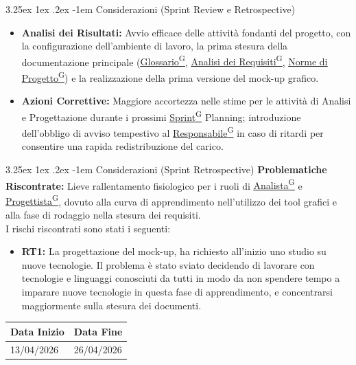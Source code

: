 \documentclass[a4paper,12pt]{article}
\makeatletter
\newcounter{subsubsubsection}[subsubsection]
\renewcommand\paragraph{\@startsection{paragraph}{5}{\z@}%
  {3.25ex \@plus1ex \@minus.2ex}%
  {-1em}%
  {\normalfont\normalsize\bfseries}}
\providecommand{\glslink}[2]{\href{https://alittlebyte-19.github.io/Documentazione/glossario.html\#gls-#1}{\underline{#2}\textsuperscript{\scriptsize G}}}
\makeatother
\begin{document}
\paragraph{Considerazioni (Sprint Review e Retrospective)}
\begin{itemize}
    \item \textbf{Analisi dei Risultati:} Avvio efficace delle attività fondanti del progetto, con la configurazione dell'ambiente di lavoro, la prima stesura della documentazione principale (\glslink{glossario}{Glossario}, \glslink{analisi-dei-requisiti-adr}{Analisi dei Requisiti}, \glslink{norme-di-progetto}{Norme di Progetto}) e la realizzazione della prima versione del mock-up grafico.
    \item \textbf{Azioni Correttive:} Maggiore accortezza nelle stime per le attività di Analisi e Progettazione durante i prossimi \glslink{sprint}{Sprint} Planning; introduzione dell'obbligo di avviso tempestivo al \glslink{responsabile}{Responsabile} in caso di ritardi per consentire una rapida redistribuzione del carico.
\end{itemize}

\paragraph{Considerazioni (Sprint Retrospective)}
\textbf{Problematiche Riscontrate:} Lieve rallentamento fisiologico per i ruoli di \glslink{analista}{Analista} e \glslink{progettista}{Progettista}, dovuto alla curva di apprendimento nell'utilizzo dei tool grafici e alla fase di rodaggio nella stesura dei requisiti.\\

I rischi riscontrati sono stati i seguenti:
\begin{itemize}
    \item \textbf{RT1:} La progettazione del mock-up, ha richiesto all'inizio uno studio su nuove tecnologie. Il problema è stato sviato decidendo di lavorare con tecnologie e linguaggi conosciuti da tutti in modo da non spendere tempo a imparare nuove tecnologie in questa fase di apprendimento, e concentrarsi maggiormente sulla stesura dei documenti. 
\end{itemize}
    \newpage


\label{sec:rtb_secondoperiodo}
\begin{table}[H]
    \centering
    \renewcommand{\arraystretch}{1.5} %
    \begin{tabularx}{\textwidth}{|X|X|}
    \hline \rowcolor{Dandelion!50}
    \textbf{Data Inizio} & \textbf{Data Fine}\\
    \hline
    13/04/2026 & 26/04/2026\\
    \hline

    \end{tabularx}
\end{table}
\end{document}
